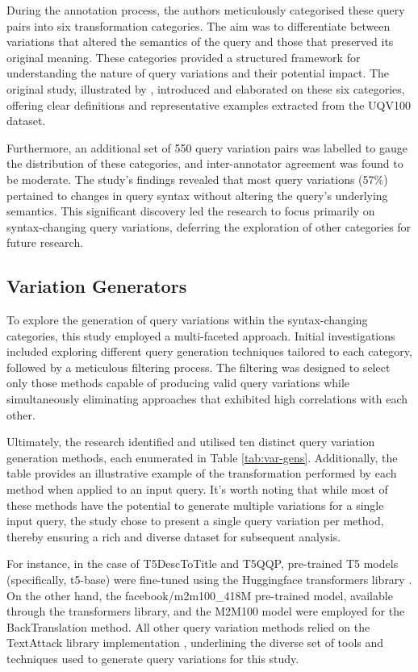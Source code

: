 During the annotation process, the authors meticulously categorised these query pairs into six transformation categories. The aim was to differentiate between variations that altered the semantics of the query and those that preserved its original meaning. These categories provided a structured framework for understanding the nature of query variations and their potential impact. The original study, illustrated by , introduced and elaborated on these six categories, offering clear definitions and representative examples extracted from the UQV100 dataset.



Furthermore, an additional set of 550 query variation pairs was labelled to gauge the distribution of these categories, and inter-annotator agreement was found to be moderate. The study's findings revealed that most query variations (57\%) pertained to changes in query syntax without altering the query's underlying semantics. This significant discovery led the research to focus primarily on syntax-changing query variations, deferring the exploration of other categories for future research.

\subsection{Variation Generators}
To explore the generation of query variations within the syntax-changing categories, this study employed a multi-faceted approach. Initial investigations included exploring different query generation techniques tailored to each category, followed by a meticulous filtering process. The filtering was designed to select only those methods capable of producing valid query variations while simultaneously eliminating approaches that exhibited high correlations with each other.


Ultimately, the research identified and utilised ten distinct query variation generation methods, each enumerated in Table \ref{tab:var-gens}. Additionally, the table provides an illustrative example of the transformation performed by each method when applied to an input query. It's worth noting that while most of these methods have the potential to generate multiple variations for a single input query, the study chose to present a single query variation per method, thereby ensuring a rich and diverse dataset for subsequent analysis.

For instance, in the case of T5DescToTitle and T5QQP, pre-trained T5 models (specifically, t5-base) were fine-tuned using the Huggingface transformers library \cite{hugging}. On the other hand, the facebook/m2m100\_418M pre-trained model, available through the transformers library, and the M2M100 model \cite{translation} were employed for the BackTranslation method. All other query variation methods relied on the TextAttack library implementation \cite{textattack}, underlining the diverse set of tools and techniques used to generate query variations for this study.

